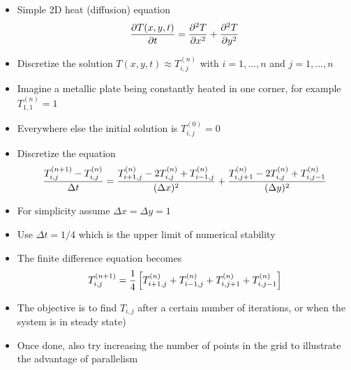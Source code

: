 \newcommand{\tnij}{\ensuremath{T^{(n)}_{i,j}}}

\begin{frame}{}
  \begin{itemize}\setlength{\itemsep}{3mm}
    \item Simple 2D heat (diffusion) equation
    \[
      {\partial T(x,y,t)\over\partial t}={\partial^2 T\over\partial x^2}+{\partial^2 T\over\partial y^2}
    \]
    \item Discretize the solution $T(x,y,t)\approx T^{(n)}_{i,j}$ with $i=1,...,n$ and $j=1,...,n$
    \item Imagine a metallic plate being constantly heated in one corner, for example $T^{(n)}_{1,1}=1$
    \item Everywhere else the initial solution is $T^{(0)}_{i,j}=0$
    \item Discretize the equation
    \[
      {T^{(n+1)}_{i,j}-\tnij\over\Delta t}=
      {T^{(n)}_{i+1,j}-2T^{(n)}_{i,j}+T^{(n)}_{i-1,j}\over(\Delta x)^2}+
      {T^{(n)}_{i,j+1}-2T^{(n)}_{i,j}+T^{(n)}_{i,j-1}\over(\Delta y)^2}
    \]
  \end{itemize}
\end{frame}

\begin{frame}{}
  \begin{itemize}\setlength{\itemsep}{3mm}
    \item For simplicity assume $\Delta x=\Delta y=1$
    \item Use $\Delta t=1/4$ which is the upper limit of numerical stability
    \item The finite difference equation becomes
    \[
      T^{(n+1)}_{i,j} = {1\over4}\left[T^{(n)}_{i+1,j}+T^{(n)}_{i-1,j}+T^{(n)}_{i,j+1}+T^{(n)}_{i,j-1}\right]
    \]
    \item The objective is to find $T_{i,j}$ after a
    certain number of iterations, or when the system is in steady state)
    \item Once done, also try increasing the number of points in the grid to illustrate the advantage of
    parallelism
  \end{itemize}
\end{frame}
